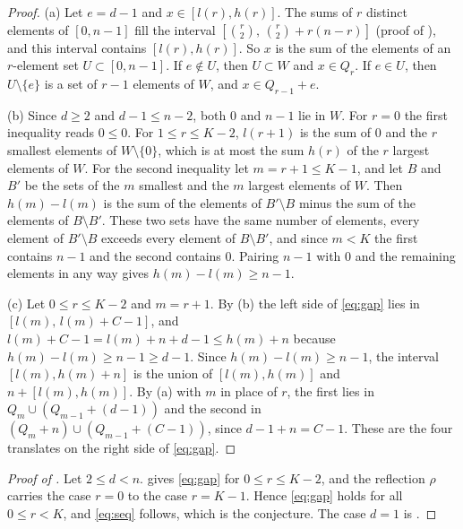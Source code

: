 \documentclass[11pt]{article}
\theoremstyle{remark}
\begin{document}
\begin{proof}
(a) Let $e=d-1$ and $x\in[l(r),h(r)]$. The sums of $r$ distinct elements of $[0,n-1]$ fill the interval
$[\binom r2,\,\binom r2+r(n-r)]$ (proof of ), and this interval contains $[l(r),h(r)]$. So $x$ is
the sum of the elements of an $r$-element set $U\subset[0,n-1]$. If $e\notin U$, then $U\subset W$ and $x\in Q_r$.
If $e\in U$, then $U\setminus\{e\}$ is a set of $r-1$ elements of $W$, and $x\in Q_{r-1}+e$.

(b) Since $d\ge 2$ and $d-1\le n-2$, both $0$ and $n-1$ lie in $W$. For $r=0$ the first inequality reads $0\le 0$.
For $1\le r\le K-2$, $l(r+1)$ is the sum of $0$ and the $r$ smallest elements of $W\setminus\{0\}$, which is at most
the sum $h(r)$ of the $r$ largest elements of $W$. For the second inequality let $m=r+1\le K-1$, and let $B$ and $B'$
be the sets of the $m$ smallest and the $m$ largest elements of $W$. Then $h(m)-l(m)$ is the sum of the elements of
$B'\setminus B$ minus the sum of the elements of $B\setminus B'$. These two sets have the same number of elements,
every element of $B'\setminus B$ exceeds every element of $B\setminus B'$, and since $m<K$ the first contains $n-1$
and the second contains $0$. Pairing $n-1$ with $0$ and the remaining elements in any way gives
$h(m)-l(m)\ge n-1$.

(c) Let $0\le r\le K-2$ and $m=r+1$. By (b) the left side of \eqref{eq:gap} lies in $[l(m),\,l(m)+C-1]$, and
$l(m)+C-1=l(m)+n+d-1\le h(m)+n$ because $h(m)-l(m)\ge n-1\ge d-1$. Since $h(m)-l(m)\ge n-1$, the interval
$[l(m),h(m)+n]$ is the union of $[l(m),h(m)]$ and $n+[l(m),h(m)]$. By (a) with $m$ in place of $r$, the first lies in
$Q_m\cup(Q_{m-1}+(d-1))$ and the second in $(Q_m+n)\cup(Q_{m-1}+(C-1))$, since $d-1+n=C-1$. These are the four
translates on the right side of \eqref{eq:gap}.
\end{proof}

\begin{proof}[Proof of ]
Let $2\le d<n$.  gives \eqref{eq:gap} for $0\le r\le K-2$, and the reflection $\rho$ carries the case
$r=0$ to the case $r=K-1$. Hence \eqref{eq:gap} holds for all $0\le r<K$, and \eqref{eq:seq} follows, which is the
conjecture. The case $d=1$ is \cite[Theorem~2]{KP}.
\end{proof}
\end{document}
